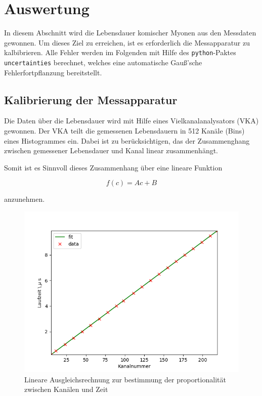 \section{Auswertung}
\label{sec:evaluation}
In diesem Abschnitt wird die Lebensdauer komischer Myonen aus den Messdaten gewonnen.
Um dieses Ziel zu erreichen, ist es erforderlich die Messapparatur zu kalbibrieren.
Alle Fehler werden im Folgenden mit Hilfe
des \texttt{python}-Paktes \texttt{uncertainties} \cite{uncertain} berechnet, welches eine automatische
Gauß'sche Fehlerfortpflanzung bereitstellt.

\subsection{Kalibrierung der Messapparatur}
\label{subsec:calibration}
Die Daten über die Lebensdauer wird mit Hilfe eines Vielkanalanalysators (VKA) gewonnen.
Der VKA teilt die gemessenen Lebensdauern in \num{512} Kanäle (Bins) eines Histogrammes ein.
Dabei ist zu berücksichtigen, das der Zusammenghang zwischen gemessener Lebensdauer und
Kanal linear zusammenhängt.

\noindent Somit ist es Sinnvoll dieses Zusammenhang über eine lineare Funktion

\begin{equation}
f(c) = Ac + B
\end{equation}

\noindent anzunehmen.

\begin{figure}[h!]
	\centering
	\includegraphics[width=\textwidth]{img/calib.png}
	\caption{Lineare Ausgleichsrechnung zur bestimmung der proportionalität zwischen Kanälen und Zeit}
	\label{abb:cal}
\end{figure}

